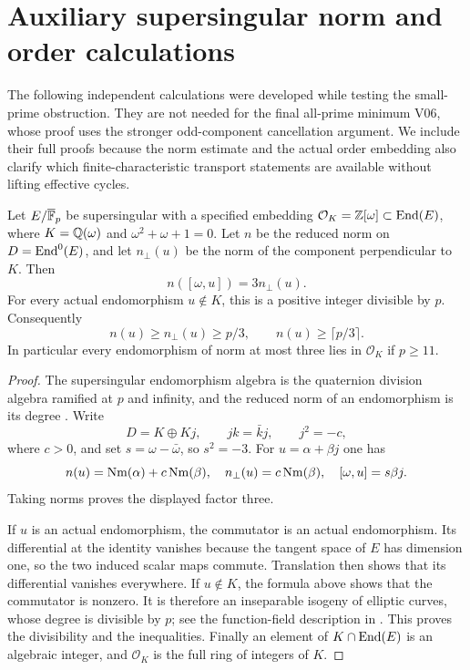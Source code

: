 \section{Auxiliary supersingular norm and order calculations}
\label{sec:auxiliary-supersingular}

The following independent calculations were developed while testing the small-prime obstruction. They are not needed for the final all-prime minimum V06, whose proof uses the stronger odd-component cancellation argument. We include their full proofs because the norm estimate and the actual order embedding also clarify which finite-characteristic transport statements are available without lifting effective cycles.

\begin{proposition}
Let $E/\overline{\mathbb F}_p$ be supersingular with a specified embedding $\mathcal O_K=\mathbb Z[\omega]\subset\operatorname{End}(E)$, where $K=\mathbb Q(\omega)$ and $\omega^2+\omega+1=0$. Let $n$ be the reduced norm on $D=\operatorname{End}^0(E)$, and let $n_\perp(u)$ be the norm of the component perpendicular to $K$. Then
\[
n([\omega,u])=3n_\perp(u).
\]
For every actual endomorphism $u\notin K$, this is a positive integer divisible by $p$. Consequently
\[
n(u)\geq n_\perp(u)\geq p/3,
\qquad n(u)\geq\lceil p/3\rceil.
\]
In particular every endomorphism of norm at most three lies in $\mathcal O_K$ if $p\geq11$.
\end{proposition}

\begin{proof}
The supersingular endomorphism algebra is the quaternion division algebra ramified at $p$ and infinity, and the reduced norm of an endomorphism is its degree \cite[II, Proposition 6.4, p.~71; Theorem 6.9, p.~73]{MilneEC}. Write
\[
D=K\oplus Kj,\qquad jk=\bar k j,\qquad j^2=-c,
\]
where $c>0$, and set $s=\omega-\bar\omega$, so $s^2=-3$. For $u=\alpha+\beta j$ one has
\[
n(u)=\operatorname{Nm}(\alpha)+c\operatorname{Nm}(\beta),\quad
n_\perp(u)=c\operatorname{Nm}(\beta),\quad
[\omega,u]=s\beta j.
\]
Taking norms proves the displayed factor three.

If $u$ is an actual endomorphism, the commutator is an actual endomorphism. Its differential at the identity vanishes because the tangent space of $E$ has dimension one, so the two induced scalar maps commute. Translation then shows that its differential vanishes everywhere. If $u\notin K$, the formula above shows that the commutator is nonzero. It is therefore an inseparable isogeny of elliptic curves, whose degree is divisible by $p$; see the function-field description in \cite[V, \S7, p.~216]{MilneEC}. This proves the divisibility and the inequalities. Finally an element of $K\cap\operatorname{End}(E)$ is an algebraic integer, and $\mathcal O_K$ is the full ring of integers of $K$.
\end{proof}

